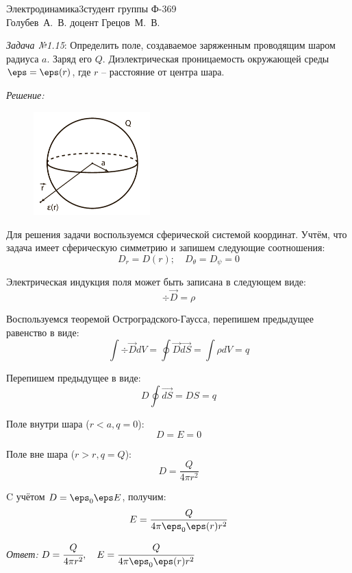 




\usepackage{wrapfig}


{Электродинамика}{3}{}{студент группы Ф-369\\Голубев~А.~В.}
{}{доцент Грецов~М.~В.}{}{}

\emph{Задача №1.15}: Определить поле, создаваемое заряженным проводящим шаром 
радиуса \( a \). Заряд его \( Q \). Диэлектрическая проницаемость окружающей 
среды \( \eps = \eps(r) \), где \( r \) -- расстояние от центра шара.

\emph{Решение:} 

\begin{figure}
	\vspace{-2ex}
	\includegraphics[width=0.4\textwidth]{pdf/image_1_15}
\end{figure}

Для решения задачи воспользуемся сферической системой координат. Учтём, что 
задача имеет сферическую симметрию и запишем следующие соотношения:
\[
	D_r = D(r);\quad
	D_\theta = D_\psi = 0
\]

Электрическая индукция поля может быть записана в следующем виде:
\[
	\div{\vec{D}} = \rho
\]

Воспользуемся теоремой Остроградского-Гаусса, перепишем предыдущее равенство 
в виде:
\[
	\int \div\vec{D} dV = \oint \vec{D}\vec{dS} = \int \rho dV = q
\]

Перепишем предыдущее в виде:
\[
	D \oint\vec{dS} = DS = q
\]

Поле внутри шара (\( r < a, q = 0 \)):
\[
	D = E = 0
\]

Поле вне шара (\( r > r, q = Q \)):
\[
	D = \frac{Q}{4\pi r^2}
\]

C учётом \( D = \eps_0\eps E \), получим:
\[
	E = \frac{Q}{4\pi\eps_0\eps(r) r^2}
\]

\emph{Ответ:} \( D = \cfrac{Q}{4\pi r^2},\quad E = \cfrac{Q}{4\pi\eps_0\eps(r) r^2}\)
 
